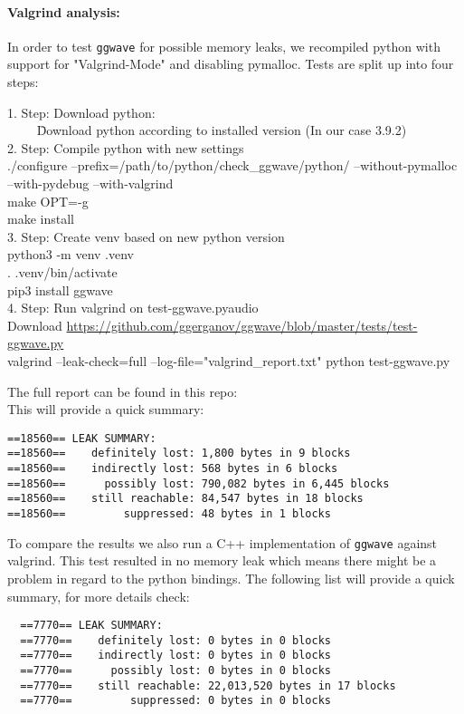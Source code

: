 \documentclass[a4paper,11pt]{report}
\begin{document}
\paragraph*{Valgrind analysis:}\label{valgrind}
In order to test \texttt{ggwave} for possible memory leaks, we recompiled python with support for "Valgrind-Mode" and disabling pymalloc.
Tests are split up into four steps:
\begin{tabbing}
1. Step: Download python: \\
~~~~ \= Download python according to installed version (In our case 3.9.2)  \\
2. Step: Compile python with new settings \\
\> ./configure --prefix=/path/to/python/check\_ggwave/python/ --without-pymalloc --with-pydebug --with-valgrind \\
\> make OPT=-g \\
\> make install \\
3. Step: Create venv based on new python version \\
\> python3 -m venv .venv \\
\> . .venv/bin/activate \\
\> pip3 install ggwave \\
4. Step: Run valgrind on test-ggwave.pyaudio \\
\> Download \url{https://github.com/ggerganov/ggwave/blob/master/tests/test-ggwave.py} \\
\> valgrind --leak-check=full --log-file="valgrind\_report.txt" python test-ggwave.py
\end{tabbing}
The full report can be found in this repo:   \\
This will provide a quick summary:

\begin{verbatim}
==18560== LEAK SUMMARY:
==18560==    definitely lost: 1,800 bytes in 9 blocks
==18560==    indirectly lost: 568 bytes in 6 blocks
==18560==      possibly lost: 790,082 bytes in 6,445 blocks
==18560==    still reachable: 84,547 bytes in 18 blocks
==18560==         suppressed: 48 bytes in 1 blocks
\end{verbatim}

To compare the results we also run a C++ implementation of \texttt{ggwave} against valgrind. This test resulted in no memory leak which means there might be a problem \newline
in regard to the python bindings. The following list will provide a quick summary, for more details check: 
\begin{verbatim}
  ==7770== LEAK SUMMARY:
  ==7770==    definitely lost: 0 bytes in 0 blocks
  ==7770==    indirectly lost: 0 bytes in 0 blocks
  ==7770==      possibly lost: 0 bytes in 0 blocks
  ==7770==    still reachable: 22,013,520 bytes in 17 blocks
  ==7770==         suppressed: 0 bytes in 0 blocks
  \end{verbatim}
\end{document}
